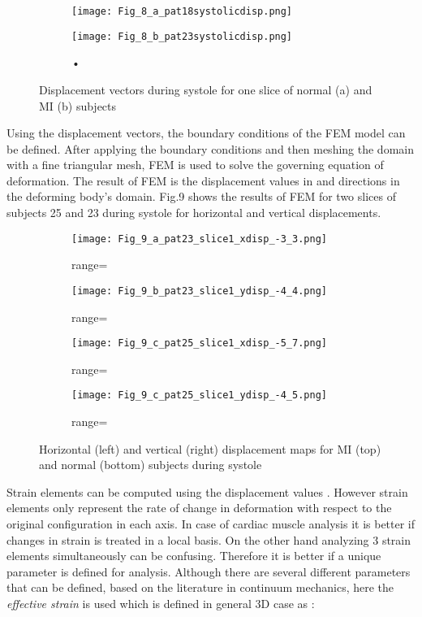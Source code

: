 \documentclass{jicspack}
\begin{document}
\begin{figure}
\centering
\begin{subfigure}[b]{.4\textwidth}
\texttt{[image: Fig\_8\_a\_pat18systolicdisp.png]}
\caption{}
\end{subfigure}
\begin{subfigure}[b]{0.4\textwidth}
\texttt{[image: Fig\_8\_b\_pat23systolicdisp.png]}
\caption{•}
\end{subfigure}
\caption{Displacement vectors during systole for one slice of normal (a) and MI (b) subjects}
\end{figure}

Using the displacement vectors, the boundary conditions of the FEM model can be defined.
After applying the boundary conditions and then meshing the domain with a fine triangular mesh, FEM is used to solve the governing equation of deformation. The result of FEM is the displacement values in  and  directions in the deforming body's domain. Fig.9 shows the results of FEM for two slices of subjects 25 and 23 during systole for horizontal and vertical displacements. 

\begin{figure}
\centering
\begin{subfigure}[b]{.45\textwidth}
\texttt{[image: Fig\_9\_a\_pat23\_slice1\_xdisp\_-3\_3.png]}
\caption{range=}
\end{subfigure}
\begin{subfigure}[b]{0.45\textwidth}
\texttt{[image: Fig\_9\_b\_pat23\_slice1\_ydisp\_-4\_4.png]}
\caption{range=}
\end{subfigure}

\begin{subfigure}[b]{.45\textwidth}
\texttt{[image: Fig\_9\_c\_pat25\_slice1\_xdisp\_-5\_7.png]}
\caption{range=}
\end{subfigure}
\begin{subfigure}[b]{0.45\textwidth}
\texttt{[image: Fig\_9\_c\_pat25\_slice1\_ydisp\_-4\_5.png]}
\caption{range=}
\end{subfigure}
\caption{Horizontal (left) and vertical (right) displacement maps for MI (top) and normal (bottom) subjects during systole}
\end{figure}

Strain elements can be computed using the displacement values . However strain elements only represent the rate of change in deformation with respect to the original configuration in each axis. In case of cardiac muscle analysis it is better if changes in strain is treated in a local basis. On the other hand analyzing 3 strain elements simultaneously can be confusing. Therefore it is better if a unique parameter is defined for analysis. Although there are several different parameters that can be defined, based on the literature in continuum mechanics, here the \textit{effective strain} is used which is defined in general 3D case as \cite{21}: 
\end{document}
